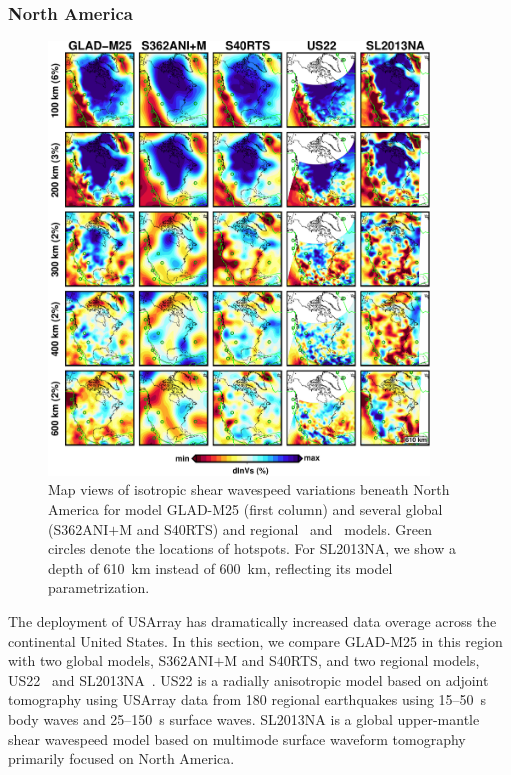 \documentclass[extra,mreferee]{gji}
\begin{document}
\subsubsection{North America}

\begin{figure}
\centering
\includegraphics[width=0.9\textwidth]{figures/depth_slice/america_vs.pdf}
  \caption{Map views of isotropic shear wavespeed variations beneath North America 
  for model GLAD-M25 (first column) and several global (S362ANI$+$M and S40RTS)
  and regional~\citep[US22;][]{zhu2017radial} and~\citep[SL2013NA;][]{schaeffer2014imaging}
  models. Green circles denote the locations of hotspots. For SL2013NA, we
  show a depth of 610~km instead of 600~km, reflecting its model parametrization.}
\label{fig:america-vs}
\end{figure}

The deployment of USArray has dramatically increased data overage across the
continental United States.
In this section, we compare GLAD-M25 in this region 
with two global models, S362ANI$+$M and S40RTS, and two regional models,
US22~\citep{zhu2017radial} and SL2013NA~\citep{schaeffer2014imaging}.
US22 is a radially anisotropic model based on adjoint tomography using
USArray data from 180 regional earthquakes using 15--50~s
body waves and 25--150~s surface waves.
SL2013NA is a global upper-mantle shear wavespeed model based on multimode
surface waveform tomography primarily focused on North America.
\end{document}
